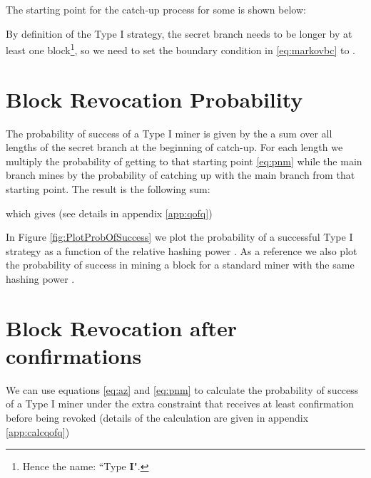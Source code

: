 \documentclass[letterpaper,12pt]{report}
\begin{document}
The starting point for the catch-up process for some  is shown below:



By definition of the Type I strategy, the secret branch needs to be longer by at least one block\footnote{Hence the name: ``Type \textbf{I}".}, so we need to set the boundary condition in \ref{eq:markovbc} to . 

\section{Block Revocation Probability}

The probability of success of a Type I miner is given by the a sum over all lengths of the secret branch at the beginning of catch-up. For each length  we multiply the probability of getting to that starting point \ref{eq:pnm} while the main branch mines  by the probability of catching up with the main branch from that starting point. The result is the following sum: 



which gives (see details in appendix \ref{app:qofq})



In Figure \ref{fig:PlotProbOfSuccess} we plot the probability of a successful Type I strategy as a function of the relative hashing power . As a reference we also plot the probability of success in mining a block for a standard miner with the same hashing power .

\noindent \begin{minipage}{\linewidth}
\label{fig:PlotProbOfSuccess}
\end{minipage}

\section{Block Revocation after  confirmations}

We can use equations \ref{eq:az} and \ref{eq:pnm} to calculate the probability of success of a Type I miner under the extra constraint that  receives at least  confirmation before being revoked (details of the calculation are given in appendix \ref{app:calcqofq})
\end{document}
